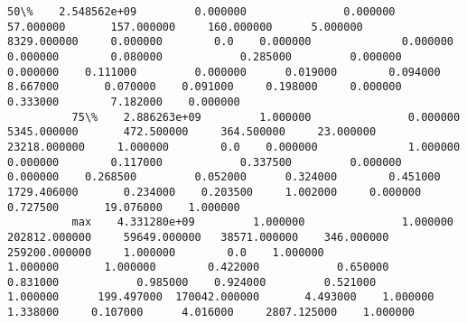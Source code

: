 \documentclass[11pt]{article}
\begin{document}
\begin{Verbatim}[commandchars=\\\{\}]
          50\%    2.548562e+09         0.000000               0.000000         57.000000       157.000000     160.000000      5.000000     8329.000000     0.000000        0.0    0.000000              0.000000       0.000000        0.080000            0.285000         0.000000            0.000000    0.111000         0.000000      0.019000        0.094000       8.667000       0.070000    0.091000     0.198000     0.000000      0.333000        7.182000    0.000000
          75\%    2.886263e+09         1.000000               0.000000       5345.000000       472.500000     364.500000     23.000000    23218.000000     1.000000        0.0    0.000000              1.000000       0.000000        0.117000            0.337500         0.000000            0.000000    0.268500         0.052000      0.324000        0.451000    1729.406000       0.234000    0.203500     1.002000     0.000000      0.727500       19.076000    1.000000
          max    4.331280e+09         1.000000               1.000000     202812.000000     59649.000000   38571.000000    346.000000   259200.000000     1.000000        0.0    1.000000              1.000000       1.000000        0.422000            0.650000         0.831000            0.985000    0.924000         0.521000      1.000000      199.497000  170042.000000       4.493000    1.000000     1.338000     0.107000      4.016000     2807.125000    1.000000
\end{Verbatim}
            
\end{document}
